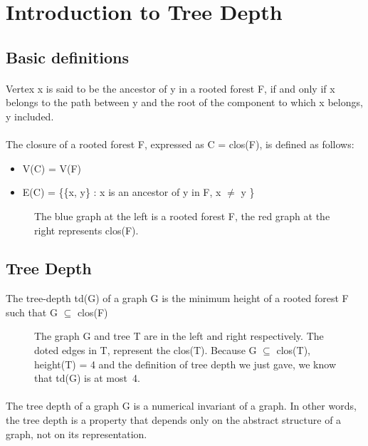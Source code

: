 \section{Introduction to Tree Depth}

\subsection{Basic definitions}

\paragraph{}
Vertex x is said to be the ancestor of y in a rooted forest F, if and only if x belongs to the path between y and the root of the component to which x belongs, y included.
\paragraph{}
The closure of a rooted forest F, expressed as C = clos(F), is defined as follows:
\begin{itemize}
  \item V(C) = V(F)
  \item E(C) = \{\{x, y\} : x is an ancestor of y in F, x $\neq$ y \}
\end{itemize}
\begin{figure}[h]

\caption{The blue graph at the left is a rooted forest F, the red graph at the right represents clos(F).}
\end{figure}

\subsection{Tree Depth}

\begin{definition}
The tree-depth td(G) of a graph G is the minimum height of a rooted forest F such that G $\subseteq$ clos(F)
\end{definition}

\begin{figure}[H]

\caption{The graph G and tree T are in the left and right respectively. The doted edges in T, represent the clos(T). Because G $\subseteq$ clos(T), height(T) = 4 and the definition of tree depth we just gave, we know that td(G) is at most~4.\label{fig:3d-cube}}
\end{figure}
\paragraph{}
The tree depth of a graph G is a numerical invariant of a graph. In other words, the tree depth is a property that depends only  on the abstract structure of a graph, not on its representation.	

